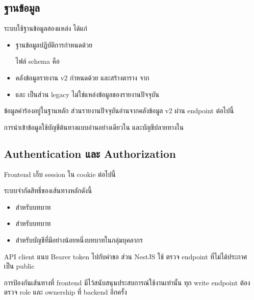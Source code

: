 \subsection{ฐานข้อมูล}
ระบบใช้ฐานข้อมูลสองแหล่ง ได้แก่
\begin{itemize}
  \item ฐานข้อมูลปฏิบัติการกำหนดด้วย 

    ไฟล์ schema คือ 
  \item คลังข้อมูลรายงาน v2 กำหนดด้วย  และสร้างตาราง  จาก 
  \item {} และ  เป็นส่วน legacy ไม่ใช่แหล่งข้อมูลของรายงานปัจจุบัน
\end{itemize}
ข้อมูลคำร้องอยู่ในฐานหลัก ส่วนรายงานปัจจุบันอ่านจากคลังข้อมูล v2 ผ่าน endpoint ต่อไปนี้
\begin{center}
\end{center}
การนำเข้าข้อมูลใช้บัญชีต้นทางแบบอ่านอย่างเดียวใน  และบัญชีปลายทางใน
\begin{center}
\end{center}

\subsection{Authentication และ Authorization}
Frontend เก็บ session ใน cookie ต่อไปนี้
\begin{center}
\end{center}

ระบบจำกัดสิทธิ์ของเส้นทางหลักดังนี้
\begin{itemize}
  \item {} สำหรับบทบาท 
  \item {} สำหรับบทบาท 
  \item {} สำหรับบัญชีที่มีอย่างน้อยหนึ่งบทบาทในกลุ่มบุคลากร
\end{itemize}

API client แนบ Bearer token ไปกับคำขอ ส่วน NestJS ใช้  ตรวจ endpoint ที่ไม่ได้ประกาศเป็น public

การป้องกันเส้นทางที่ frontend มีไว้สนับสนุนประสบการณ์ใช้งานเท่านั้น ทุก write endpoint ต้องตรวจ role และ ownership ที่ backend อีกครั้ง
